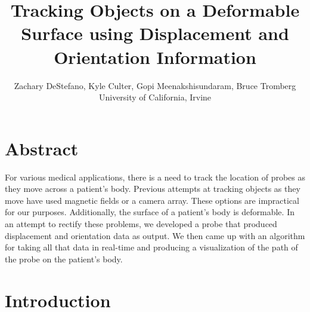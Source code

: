 \documentclass[11pt,psfig]{article}
\begin{document}
\setlength{\parskip}{1.2ex plus0.3ex minus 0.3ex}


\thispagestyle{empty} \pagestyle{myheadings} 



\title{Tracking Objects on a Deformable Surface using Displacement and Orientation Information}
\author{Zachary DeStefano, Kyle Culter, Gopi Meenakshisundaram, Bruce Tromberg\\ University of California, Irvine}

\maketitle

\vfill\eject

\section*{Abstract}

For various medical applications, there is a need to track the location of probes as they move across a patient's body. Previous attempts at tracking objects as they move have used magnetic fields or a camera array. These options are impractical for our purposes. Additionally, the surface of a patient's body is deformable. In an attempt to rectify these problems, we developed a probe that produced displacement and orientation data as output. We then came up with an algorithm for taking all that data in real-time and producing a visualization of the path of the probe on the patient's body. 

\section*{Introduction}
\end{document}
